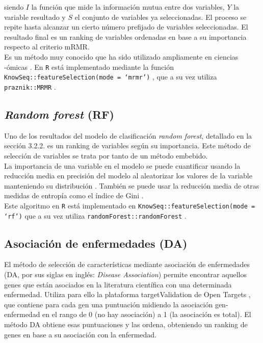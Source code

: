 siendo $I$ la función que mide la información mutua entre dos variables, $Y$ la variable resultado y $S$ el conjunto de variables ya seleccionadas. El proceso se repite hasta alcanzar un cierto número prefijado de variables seleccionadas. El resultado final es un ranking de variables ordenadas en base a su importancia respecto al criterio mRMR.\\

Es un método muy conocido que ha sido utilizado ampliamente en ciencias -ómicas \cite{Ding2005, Yang2013, Galvez2018, Castillo2019, Galvez2020}. En \texttt{R}  está implementado mediante la función \texttt{KnowSeq::\linebreak featureSelection(mode = `mrmr')} \cite{KnowSeq}, que a su vez utiliza \texttt{praznik::MRMR} \cite{Kursa2020}.

\subsection{\textit{Random forest} (RF)}

Uno de los resultados del modelo de clasificación \textit{random forest}, detallado en la sección 3.2.2. es un ranking de variables según su importancia. Este método de selección de variables se trata por tanto de un método embebido.\\

La importancia de una variable en el modelo se puede cuantificar usando la reducción media en precisión del modelo al aleatorizar los valores de la variable manteniendo su distribución \cite{Breiman2001, Breiman2002}. También se puede usar la reducción media de otras medidas de entropía como el índice de Gini \cite{Louppe2013}.\\

Este algoritmo en \texttt{R}  está implementado en \texttt{KnowSeq::featureSelection(mode = `rf')} \cite{KnowSeq} que a su vez utiliza \texttt{randomForest::randomForest} \cite{Liaw2002}.

\subsection{Asociación de enfermedades (DA)}

El método de selección de características mediante asociación de enfermedades (DA, por sus siglas en inglés: \textit{Disease Association}) permite encontrar aquellos genes que están asociados en la literatura científica con una determinada enfermedad. Utiliza para ello la plataforma targetValidation de Open Targets \cite{OpenTargets2020}, que contiene para cada gen una puntuación midiendo la asociación gen-enfermedad en el rango de 0 (no hay asociación) a 1 (la asociación es total). El método DA obtiene esas puntuaciones y las ordena, obteniendo un ranking de genes en base a su asociación con la enfermedad.\\

